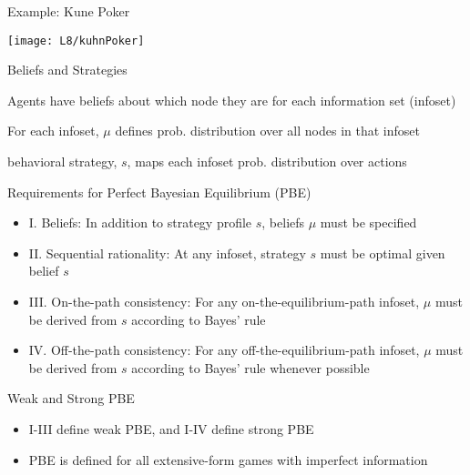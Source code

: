 \documentclass[11pt,aspectratio=169]{beamer}
\begin{document}
  
  \begin{frame}{Example: Kune Poker}
   \begin{center}
    \texttt{[image: L8/kuhnPoker]}
   \end{center}
  \end{frame}
    
  
  \begin{frame}{Beliefs and Strategies}
   \begin{itemizes}[1.5em]
    \item Agents have \alert{beliefs} about which node they are for each information set (\alert{infoset})
    \item For each infoset, $\mu$ defines \alert{prob. distribution} over all nodes in that infoset
    \item \alert{behavioral strategy}, $s$, maps each infoset prob. distribution over actions
   \end{itemizes}
  \end{frame}
  
  
  \begin{frame}{Requirements for Perfect Bayesian Equilibrium (PBE)}
   \begin{itemize}[<+->]
   \setlength{\itemsep}{1em}
    \item I. Beliefs: In addition to strategy profile $s$, beliefs $\mu$ must be specified
    \item II. \alert{Sequential rationality}: At any infoset, strategy $s$ must be optimal given belief $s$
    \item III. \alert{On-the-path consistency}: For any on-the-equilibrium-path infoset, $\mu$ must be derived from $s$ according to \alert{Bayes' rule}
    \item IV. \alert{Off-the-path consistency}: For any off-the-equilibrium-path infoset, $\mu$ must be derived from $s$ according to Bayes' rule \alert{whenever possible}
   \end{itemize}     
  \end{frame}

  
  \begin{frame}{Weak and Strong PBE}
   \begin{itemize}
   \setlength{\itemsep}{2em}
    \item I-III define \alert{weak PBE}, and I-IV define {strong PBE}
    \item PBE is defined for all extensive-form games with imperfect information
   \end{itemize}
  \end{frame}
  
\end{document}
